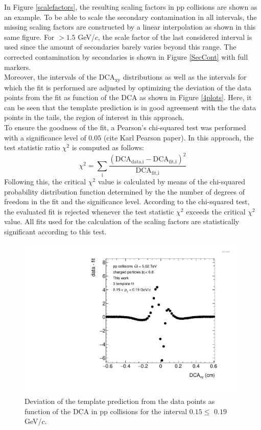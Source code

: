 \documentclass[12pt,a4paper]{report}
\begin{document}
In Figure \ref{scalefactors}, the resulting scaling factors in pp collisions are shown as an example. To be able to scale the secondary contamination in all \pt intervals, the missing scaling factors are constructed by a linear interpolation as shown in this same figure. For \pt $> 1.5$ GeV/$c$, the scale factor of the last considered \pt interval is used since the amount of secondaries barely varies beyond this range. The corrected contamination by secondaries is shown in Figure \ref{SecCont} with full markers.\\
Moreover, the intervals of the DCA$_{\text{xy}}$ distributions as well as the \pt intervals for which the fit is performed are adjusted by optimizing the deviation of the data points from the fit as function of the DCA as shown in Figure \ref{4plots}. Here, it can be seen that the template prediction is in good agreement with the the data points in the tails, the region of interest in this approach.\\
To ensure the goodness of the fit, a Pearson's chi-squared test was performed with a significance level of $0.05$ (cite Karl Pearson paper). In this approach, the test statistic ratio $\chi^2$ is computed as follows:
\begin{equation}
\chi^2 = \sum_{\text{i}} \dfrac{(\text{DCA}_\text{data,i} - \text{DCA}_\text{fit,i})^2}{\text{DCA}_\text{fit,i}}
\end{equation}
Following this, the critical $\chi^2$ value is calculated by means of the chi-squared probability distribution function determined by the the number of degrees of freedom in the fit and the significance level. According to the chi-squared test, the evaluated fit is rejected whenever the test statistic $\chi^2$ exceeds the critical $\chi^2$ value. All fits used for the calculation of the scaling factors are statistically significant according to this test. 
\begin{figure}[tb!]
\centering
\includegraphics[width=11cm]{Plots/Pulls_Pt0_Mult0.pdf}  
\caption{Deviation of the template prediction from the data points as function of the DCA in pp collisions for the \pt interval $0.15 \leq$ \pt $0.19$ GeV/$c$.}
\label{Pulls}
\end{figure}
\end{document}
